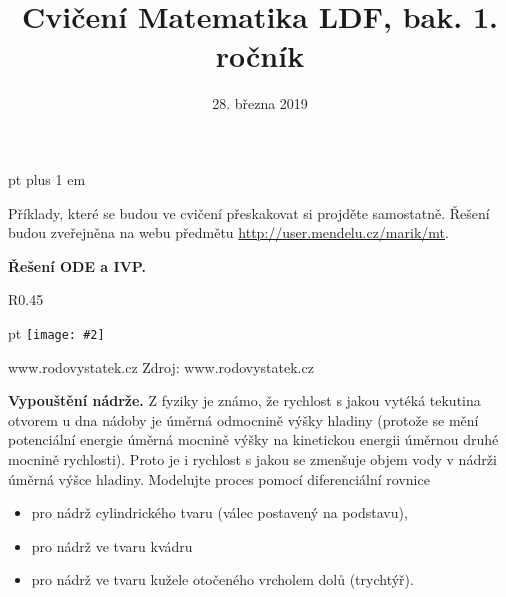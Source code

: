 \documentclass{article}
\def\zlomek{0.45}
\def\nic{}
\newcommand\obrazek[2][pixabay.com]{
  \clearpage
  \def\test{#1}
\begin{wrapfigure}{R}{\zlomek\linewidth}
  \begin{minipage}{1.0\linewidth}\parskip 0 pt
  \texttt{[image: \#2]}

  \vspace*{-10pt}
  \ifx\test\nic\else
  \null\hfill{\color{gray}\footnotesize Zdroj: #1}
  \fi

  \mezera
  \end{minipage}
\end{wrapfigure}
}
\let\oldtextbf\textbf
\def\textbf#1{%
  \oldtextbf{\color{red} #1}}
\def\mezera{\vspace*{10pt}}
\begin{document}
 pt plus 1 em
\title{Cvičení Matematika LDF, bak. 1. ročník}
\date{28. března 2019}
\maketitle

Příklady, které se budou ve cvičení přeskakovat si projděte
samostatně. Řešení budou zveřejněna na webu předmětu \url{http://user.mendelu.cz/marik/mt}.

\newpage


\def\tg{\mathop{\mathrm{tg}}}
\def\cotg{\mathop{\mathrm{cotg}}}
\def\arctg{\mathop{\mathrm{arctg}}}


\textbf{Řešení ODE a IVP.} 



\newpage


\obrazek[www.rodovystatek.cz]{voda_plastovky.jpg}


\textbf{Vypouštění nádrže.} Z fyziky je známo, že rychlost s jakou
vytéká tekutina otvorem u dna nádoby je úměrná odmocnině výšky hladiny
(protože se mění potenciální energie úměrná mocnině výšky na
kinetickou energii úměrnou druhé mocnině rychlosti). Proto je i
rychlost s jakou se zmenšuje objem vody v nádrži úměrná výšce
hladiny. Modelujte proces pomocí diferenciální rovnice
\begin{itemize}
\item pro nádrž
cylindrického tvaru (válec postavený na podstavu), 
\item pro nádrž ve tvaru
kvádru 
\item pro nádrž ve tvaru kužele otočeného vrcholem dolů (trychtýř).
\end{itemize}
\end{document}

